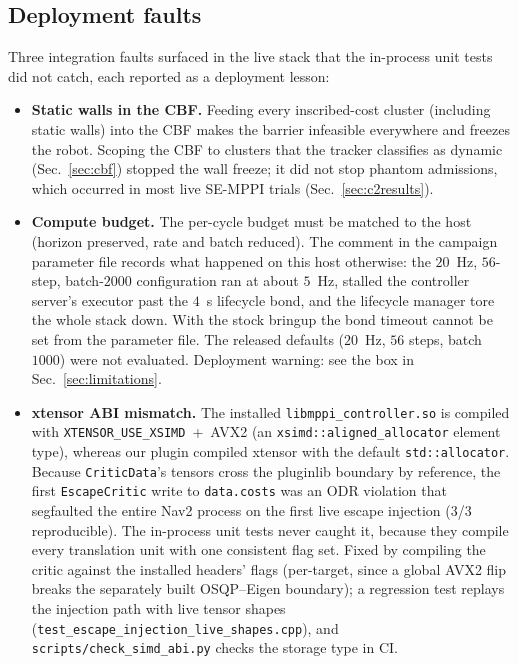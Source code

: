 \documentclass[journal]{IEEEtran}
\begin{document}
\subsection{Deployment faults}
\label{sec:integration}

Three integration faults surfaced in the live stack that the in-process unit tests did not
catch, each reported as a deployment lesson:
\begin{itemize}
\item \textbf{Static walls in the CBF.} Feeding every inscribed-cost cluster
  (including static walls) into the CBF makes the barrier infeasible
  everywhere and freezes the robot. Scoping the CBF to clusters that the tracker
  classifies as dynamic (Sec.~\ref{sec:cbf}) stopped the wall freeze; it did not stop
  phantom admissions, which occurred in most live SE-MPPI trials (Sec.~\ref{sec:c2results}).
\item \textbf{Compute budget.} The per-cycle budget must be matched to the
  host (horizon preserved, rate and batch reduced). The comment in the campaign
  parameter file records what happened on this host otherwise: the $20$~Hz, $56$-step,
  batch-$2000$ configuration ran at about $5$~Hz, stalled the controller server's executor
  past the $4$~s lifecycle bond, and the lifecycle manager tore the whole stack down. With the
  stock bringup the bond timeout cannot be set from the parameter file. The released defaults
  ($20$~Hz, $56$ steps, batch $1000$) were not evaluated. Deployment warning: see the box in Sec.~\ref{sec:limitations}.
\item \textbf{xtensor ABI mismatch.} The installed
  \texttt{libmppi\_controller.so} is compiled with
  \texttt{XTENSOR\_USE\_XSIMD}~+~AVX2 (an \texttt{xsimd::aligned\_allocator}
  element type), whereas our plugin compiled xtensor with the default
  \texttt{std::allocator}. Because \texttt{CriticData}'s tensors cross the
  pluginlib boundary by reference, the first \texttt{EscapeCritic} write to
  \texttt{data.costs} was an ODR violation that segfaulted the entire Nav2
  process on the first live escape injection (3/3 reproducible). The
  in-process unit tests never caught it, because they compile every
  translation unit with one consistent flag set. Fixed by compiling the
  critic against the installed headers' flags (per-target, since a global
  AVX2 flip breaks the separately built OSQP--Eigen boundary); a regression
  test replays the injection path with live tensor shapes
  (\texttt{test\_escape\_injection\_live\_shapes.cpp}), and
  \texttt{scripts/check\_simd\_abi.py} checks the storage type in CI.
\end{itemize}
\end{document}
